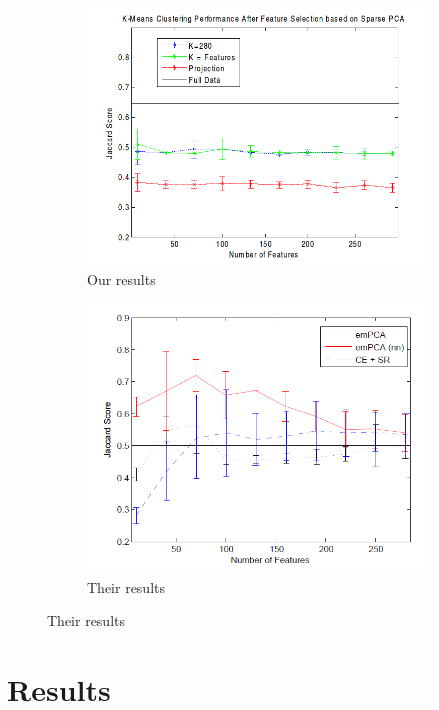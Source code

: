 \documentclass{article}
\begin{document}
\begin{figure}[h,width=\textwidth]
\caption{Variance versus cardinality for gene data}
\label{fig:jacard}
\begin{subfigure}{0.5\textwidth}
\caption{Our results}
\includegraphics[width=\textwidth]{8.png}
\end{subfigure}
\begin{subfigure}{0.5\textwidth}
\caption{Their results}
\includegraphics[width=\textwidth]{7.png}
\end{subfigure}
\end{figure}

\section{Results}
\end{document}
